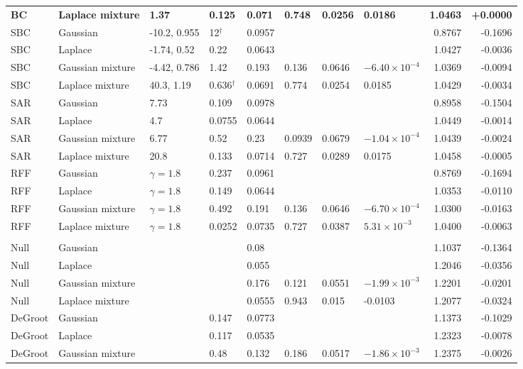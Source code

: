 \begin{longtable}{llllllllrr}
\textbf{BC} & \textbf{Laplace mixture} & \textbf{1.37} & \textbf{0.125} & \textbf{0.071} & \textbf{0.748} & \textbf{0.0256} & \textbf{0.0186} & \textbf{1.0463} & \textbf{+0.0000} \\
SBC & Gaussian & -10.2, 0.955 & 12$^{\dagger}$ & 0.0957 &  &  &  & 0.8767 & -0.1696 \\
SBC & Laplace & -1.74, 0.52 & 0.22 & 0.0643 &  &  &  & 1.0427 & -0.0036 \\
SBC & Gaussian mixture & -4.42, 0.786 & 1.42 & 0.193 & 0.136 & 0.0646 & $-6.40\times10^{-4}$ & 1.0369 & -0.0094 \\
SBC & Laplace mixture & 40.3, 1.19 & 0.636$^{\dagger}$ & 0.0691 & 0.774 & 0.0254 & 0.0185 & 1.0429 & -0.0034 \\
SAR & Gaussian & 7.73 & 0.109 & 0.0978 &  &  &  & 0.8958 & -0.1504 \\
SAR & Laplace & 4.7 & 0.0755 & 0.0644 &  &  &  & 1.0449 & -0.0014 \\
SAR & Gaussian mixture & 6.77 & 0.52 & 0.23 & 0.0939 & 0.0679 & $-1.04\times10^{-4}$ & 1.0439 & -0.0024 \\
SAR & Laplace mixture & 20.8 & 0.133 & 0.0714 & 0.727 & 0.0289 & 0.0175 & 1.0458 & -0.0005 \\
RFF & Gaussian & $\gamma=1.8$ & 0.237 & 0.0961 &  &  &  & 0.8769 & -0.1694 \\
RFF & Laplace & $\gamma=1.8$ & 0.149 & 0.0644 &  &  &  & 1.0353 & -0.0110 \\
RFF & Gaussian mixture & $\gamma=1.8$ & 0.492 & 0.191 & 0.136 & 0.0646 & $-6.70\times10^{-4}$ & 1.0300 & -0.0163 \\
RFF & Laplace mixture & $\gamma=1.8$ & 0.0252 & 0.0735 & 0.727 & 0.0387 & $5.31\times10^{-3}$ & 1.0400 & -0.0063 \\
\midrule
\multicolumn{10}{l}{\house{}} \\
Null & Gaussian &  &  & 0.08 &  &  &  & 1.1037 & -0.1364 \\
Null & Laplace &  &  & 0.055 &  &  &  & 1.2046 & -0.0356 \\
Null & Gaussian mixture &  &  & 0.176 & 0.121 & 0.0551 & $-1.99\times10^{-3}$ & 1.2201 & -0.0201 \\
Null & Laplace mixture &  &  & 0.0555 & 0.943 & 0.015 & -0.0103 & 1.2077 & -0.0324 \\
DeGroot & Gaussian &  & 0.147 & 0.0773 &  &  &  & 1.1373 & -0.1029 \\
DeGroot & Laplace &  & 0.117 & 0.0535 &  &  &  & 1.2323 & -0.0078 \\
DeGroot & Gaussian mixture &  & 0.48 & 0.132 & 0.186 & 0.0517 & $-1.86\times10^{-3}$ & 1.2375 & -0.0026 \\

\end{longtable}
